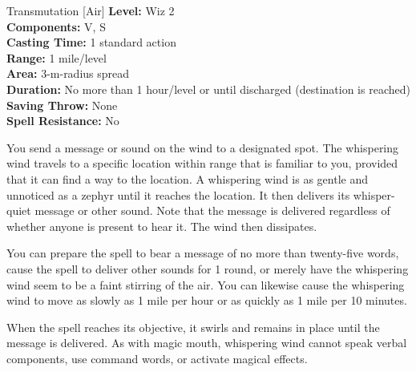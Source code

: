 {Transmutation [Air]}
{
	\textbf{Level:}
	Wiz 2\\
	\textbf{Components:}
	V, S\\
	\textbf{Casting Time:}
	1 standard action\\
	\textbf{Range:}
	1 mile/level\\
	\textbf{Area:}
	3-m-radius spread\\
	\textbf{Duration:}
	No more than 1 hour/level or until discharged (destination is reached)\\
	\textbf{Saving Throw:}
	None\\
	\textbf{Spell Resistance:}
	No\\
}
{
	You send a message or sound on the wind to a designated spot. The whispering wind travels to a specific location within range that is familiar to you, provided that it can find a way to the location. A whispering wind is as gentle and unnoticed as a zephyr until it reaches the location. It then delivers its whisper-quiet message or other sound. Note that the message is delivered regardless of whether anyone is present to hear it. The wind then dissipates.

	You can prepare the spell to bear a message of no more than twenty-five words, cause the spell to deliver other sounds for 1 round, or merely have the whispering wind seem to be a faint stirring of the air. You can likewise cause the whispering wind to move as slowly as 1 mile per hour or as quickly as 1 mile per 10 minutes.

	When the spell reaches its objective, it swirls and remains in place until the message is delivered. As with magic mouth, whispering wind cannot speak verbal components, use command words, or activate magical effects.

}
